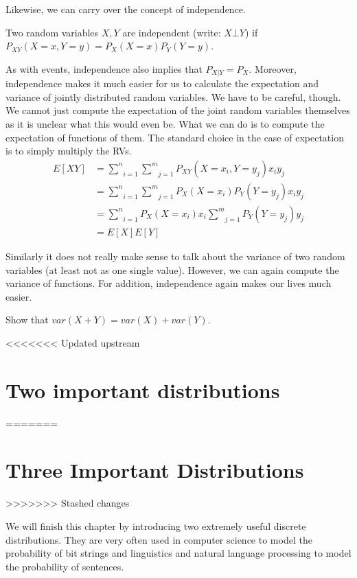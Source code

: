\documentclass[a4paper,11pt,leqno]{report}
\begin{document}
\begin{Definition}
Likewise, we can carry over the concept of independence.

\begin{Definition}
Two random variables $ X,Y $ are independent (write: $ X \bot Y $) if $ P_{XY}(X=x, Y=y) = P_{X}(X=x)P_{Y}(Y=y) $.
\end{Definition}

As with events, independence also implies that $ P_{X|Y} = P_{X} $. Moreover, independence makes it much easier for us
to calculate the expectation and variance of jointly distributed random variables. We have to be careful, though. We
cannot just compute the expectation of the joint random variables themselves as it is unclear what this would even be.
What we can do is to compute the expectation of functions of them. The standard choice in the case of expectation
is to simply multiply the RVs.
\begin{align}
E[XY] &= \underset{i=1}{\overset{n}{\sum}}\underset{j=1}{\overset{m}{\sum}} P_{XY}(X=x_{i},Y=y_{j}) x_{i}y_{j} \\
&= \underset{i=1}{\overset{n}{\sum}}\underset{j=1}{\overset{m}{\sum}} P_{X}(X=x_{i})P_{Y}(Y=y_{j}) x_{i}y_{j} \\
&= \underset{i=1}{\overset{n}{\sum}}P_{X}(X=x_{i})x_{i} \underset{j=1}{\overset{m}{\sum}} P_{Y}(Y=y_{j}) y_{j} \\
&= E[X]E[Y]
\end{align}

Similarly it does not really make sense to talk about the variance of two random variables (at least not as one single
value). However, we can again compute the variance of functions. For addition, independence again makes our lives
much easier.

\begin{Exercise}
Show that $ var(X + Y) = var(X) + var(Y) $.
\end{Exercise}



<<<<<<< Updated upstream
\section{Two important distributions}
=======
\section{Three Important Distributions}
>>>>>>> Stashed changes

We will finish this chapter by introducing two extremely useful discrete distributions. They are very often used in
computer science to model the probability of bit strings and linguistics and natural language processing to model
the probability of sentences. 


\end{Definition}
\end{document}
